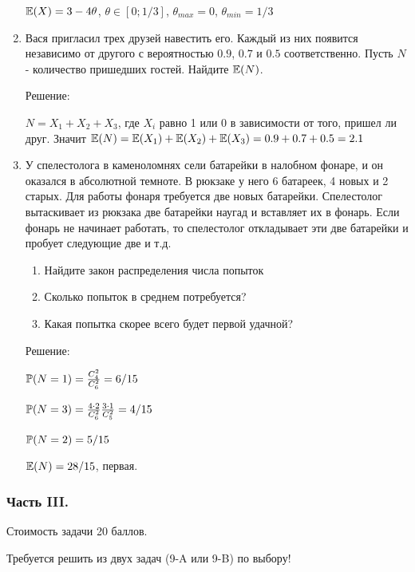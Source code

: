\documentclass[12pt, a4paper]{article}\usepackage[]{graphicx}\usepackage[]{color}
\begin{document}
\begin{enumerate}
$\E(X)=3-4\theta$, $\theta\in[0;1/3]$, $\theta_{max}=0$, $\theta_{min}=1/3$

\item Вася пригласил трех друзей навестить его. Каждый из них появится
независимо от другого с вероятностью $0.9$, $0.7$ и $0.5$
соответственно. Пусть $N$ - количество пришедших гостей. Найдите $\E(N)$.

Решение:

$N=X_{1}+X_{2}+X_{3}$, где $X_{i}$ равно 1 или 0 в зависимости от того, пришел ли друг. Значит $\E(N)=\E(X_{1})+\E(X_{2})+\E(X_{3})=0.9+0.7+0.5=2.1$

\item У спелестолога в каменоломнях сели батарейки в налобном фонаре, и он оказался в абсолютной темноте. В рюкзаке у него 6 батареек, 4 новых и 2 старых. Для работы фонаря требуется две новых батарейки. Спелестолог вытаскивает из рюкзака две батарейки наугад и вставляет их в фонарь. Если фонарь не начинает работать, то спелестолог откладывает эти две батарейки и пробует следующие две и т.д.
\begin{enumerate}
\item Найдите закон распределения числа попыток
\item Сколько попыток в среднем потребуется?
\item Какая попытка скорее всего будет первой удачной?
\end{enumerate}

Решение:

$\P(N=1)=\frac{C_{4}^{2}}{C_{6}^{2}}=6/15$

$\P(N=3)=\frac{4\cdot 2}{C_{6}^{2}}\frac{3\cdot 1}{C_{5}^{2}}=4/15$

$\P(N=2)=5/15$

$\E(N)=28/15$, первая.
\end{enumerate}

\subsubsection*{Часть III.}

Стоимость задачи 20 баллов.

Требуется решить \textbf{} из двух задач (9-A или 9-B) по
выбору!
\end{document}
